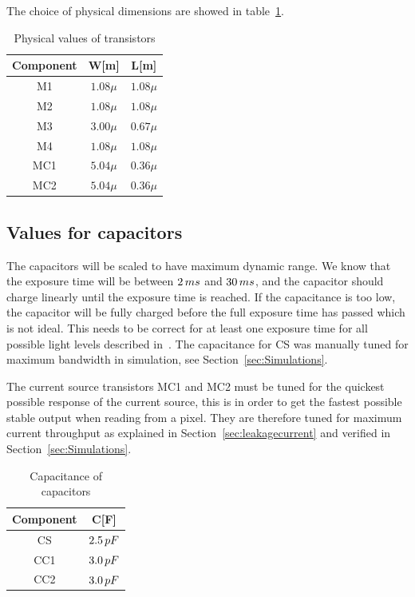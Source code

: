 The choice of physical dimensions are showed in table~\ref{tab:transcomponentvalues}.

\begin{table}[H]
  \centering
  \caption{Physical values of transistors}
  \begin{tabular}{ c | c c }
    Component & W[m] & L[m] \\
    \midrule
    M1 & $1.08\mu$ & $1.08\mu$ \\
    M2 & $1.08\mu$ & $1.08\mu$ \\
    M3 & $3.00\mu$ & $0.67\mu$ \\
    M4 & $1.08\mu$ & $1.08\mu$ \\
    MC1 & $5.04\mu$ & $0.36\mu$ \\
    MC2 & $5.04\mu$ & $0.36\mu$
  \end{tabular}
  \label{tab:transcomponentvalues}
\end{table}



\subsection{Values for capacitors}

The capacitors will be scaled to have maximum dynamic range. We know that the exposure time  will be between $2 \mskip3mu ms$ and $30 \mskip3mu ms$, and the capacitor should charge linearly until the exposure time is reached.
If the capacitance is too low, the capacitor will be fully charged before the full exposure time has passed which is not ideal.
This needs to be correct for at least one exposure time for all possible light levels described in~\cite{oppgave}.
The capacitance for CS was manually tuned for maximum bandwidth in simulation, see Section~\ref{sec:Simulations}.

The current source transistors MC1 and MC2 must be tuned for the quickest possible response of the current source, this is in order to get the fastest possible stable output when reading from a pixel.
They are therefore tuned for maximum current throughput as explained in Section~\ref{sec:leakagecurrent} and verified in Section~\ref{sec:Simulations}.

\begin{table}[htbp]
  \centering
  \caption{Capacitance of capacitors}
  \begin{tabular}{c | c}
    Component & C[F] \\
    \midrule
    CS & $2.5 \mskip3mu pF$ \\
    CC1 & $3.0 \mskip3mu pF$ \\
    CC2 & $3.0 \mskip3mu pF$
  \end{tabular}\label{tab:capcomponentvalues}
\end{table}
